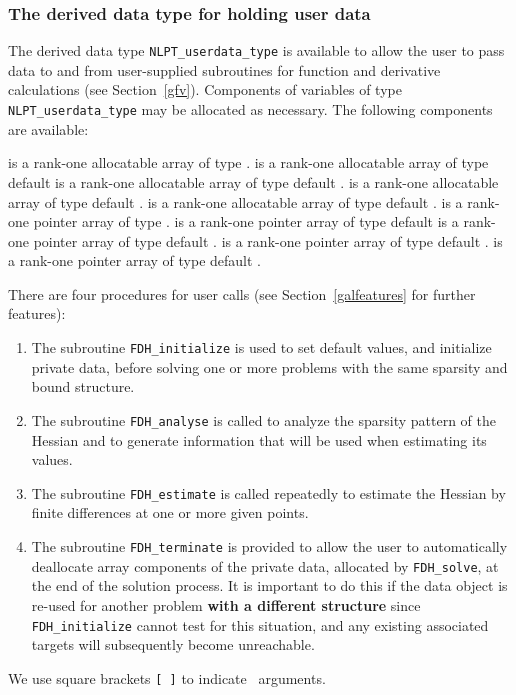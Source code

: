 \documentclass{galahad}
\newcommand{\packagename}{FDH}
\begin{document}

\subsubsection{The derived data type for holding user data}\label{typeuserdata}
The derived data type 
{\tt NLPT\_userdata\_type} 
is available to allow the user to pass data to and from user-supplied 
subroutines for function and derivative calculations (see Section~\ref{gfv}).
Components of variables of type {\tt NLPT\_userdata\_\-type} may be allocated as
necessary. The following components are available:

\begin{description}
 is a rank-one allocatable array of type \integer.
 is a rank-one allocatable array of type default  \realdp
{} is a rank-one allocatable array of type default \complexdp.
 is a rank-one allocatable array of type default \character.
 is a rank-one allocatable array of type default \logical.
 is a rank-one pointer array of type \integer.
 is a rank-one pointer array of type default  \realdp
{} is a rank-one pointer array of type default \complexdp.
 is a rank-one pointer array of type default \character.
 is a rank-one pointer array of type default \logical.
\end{description}


\galarguments
There are four procedures for user calls
(see Section~\ref{galfeatures} for further features): 

\begin{enumerate}
\item The subroutine 
      {\tt \packagename\_initialize} 
      is used to set default values, and initialize private data, 
      before solving one or more problems with the
      same sparsity and bound structure.
\item The subroutine 
      {\tt \packagename\_analyse} 
      is called to analyze the sparsity pattern of the Hessian
      and to generate information that will be used when estimating 
      its values.
\item The subroutine 
      {\tt \packagename\_estimate} 
      is called repeatedly to estimate the Hessian by finite differences at 
      one or more given points.
\item The subroutine 
      {\tt \packagename\_terminate} 
      is provided to allow the user to automatically deallocate array 
       components of the private data, allocated by 
       {\tt \packagename\_solve}, 
       at the end of the solution process. 
       It is important to do this if the data object is re-used for another 
       problem {\bf with a different structure}
       since {\tt \packagename\_initialize} cannot test for this situation, 
       and any existing associated targets will subsequently become unreachable.
\end{enumerate}
We use square brackets {\tt [ ]} to indicate \optional\ arguments.
\end{document}
